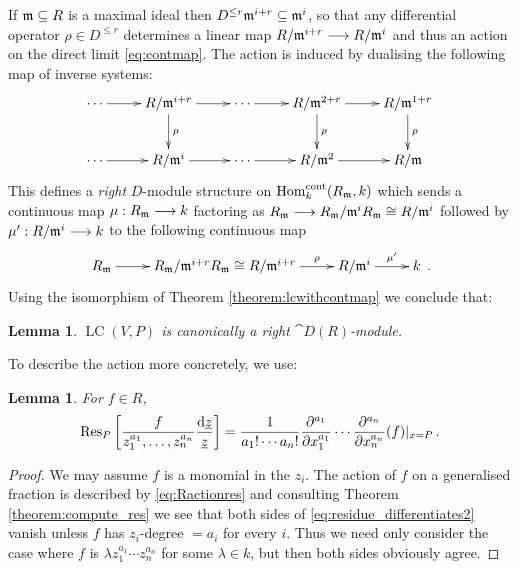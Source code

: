 \documentclass[english,letter paper,12pt,reqno]{article}
\newtheorem{lemma}[theorem]{Lemma}
\theoremstyle{example}
\numberwithin{equation}{section}
\def\Hom{\operatorname{Hom}}
\DeclareMathOperator{\LC}{LC}
\begin{document}
If $\mathfrak{m} \subseteq R$ is a maximal ideal then $D^{\le r} \mathfrak{m}^{i+r} \subseteq \mathfrak{m}^i$, so that any differential operator $\rho \in D^{\le r}$ determines a linear map $R/\mathfrak{m}^{i+r} \longrightarrow R/\mathfrak{m}^i$ and thus an action on the direct limit \eqref{eq:contmap}. The action is induced by dualising the following map of inverse systems:
\[
\xymatrix{
\cdots \ar[r] & R/\mf{m}^{i+r} \ar[r] \ar[d]^\rho & \cdots \ar[r] & R/\mf{m}^{2+r} \ar[r]\ar[d]^\rho & R/\mf{m}^{1+r} \ar[d]^\rho\\
\cdots \ar[r] & R/\mf{m}^{i} \ar[r] & \cdots \ar[r] & R/\mf{m}^2 \ar[r] & R/\mf{m}
}
\]
This defines a \emph{right} $D$-module structure on $\Hom_k^{\cont}(R_{\mf{m}}, k)$ which sends a continuous map $\mu: R_{\mathfrak{m}} \longrightarrow k$ factoring as $R_{\mathfrak{m}} \longrightarrow R_{\mathfrak{m}}/\mathfrak{m}^i R_{\mathfrak{m}} \cong R/\mathfrak{m}^i$ followed by $\mu': R/\mathfrak{m}^i \longrightarrow k$ to the following continuous map
\[
\xymatrix{
R_{\mf{m}} \ar[r] & R_{\mf{m}}/\mf{m}^{i+r}R_{\mf{m}} \cong R/\mf{m}^{i+r} \ar[r]^-{\rho} & R/\mf{m}^i \ar[r]^-{\mu'} & k
}\,.
\]
Using the isomorphism of Theorem \ref{theorem:lcwithcontmap} we conclude that:

\begin{lemma}\label{lemma:dmodulestructure} $\LC(V,P)$ is canonically a right $\cat{D}(R)$-module.
\end{lemma}

To describe the action more concretely, we use:

\begin{lemma}\label{lemma:residue_differentiates_0} For $f \in R$,
\begin{equation}\label{eq:residue_differentiates2}
\operatorname{Res}\!_P\left[ \frac{f}{z_1^{a_1}, \ldots, z_n^{a_n}} \frac{\operatorname{d}\!{\underline{z}}}{\underline{z}} \right] = \frac{1}{{a_1}! \cdots {a_n}!} \frac{\partial^{a_1}}{\partial x_1^{a_1}} \cdots \frac{\partial^{a_n}}{\partial x_n^{a_n}}(f) |_{x = P}\,.
\end{equation}
\end{lemma}
\begin{proof}
We may assume $f$ is a monomial in the $z_i$. The action of $f$ on a generalised fraction is described by \eqref{eq:Ractionres} and consulting Theorem \ref{theorem:compute_res} we see that both sides of \eqref{eq:residue_differentiates2} vanish unless $f$ has $z_i$-degree $= a_i$ for every $i$. Thus we need only consider the case where $f$ is $\lambda z_1^{a_1} \cdots z_n^{a_n}$ for some $\lambda \in k$, but then both sides obviously agree.
\end{proof}
\end{document}
